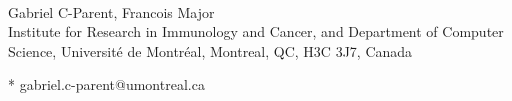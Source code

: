 \documentclass[10pt,letterpaper]{article}
\date{}
\begin{document}
\vspace*{0.35in}

\begin{flushleft}
{\Large
\textbf{}
}
\newline
\\
Gabriel C-Parent, %
Francois Major%
\\
\bigskip
Institute for Research in Immunology and Cancer, and Department of Computer Science, Université de Montréal, Montreal, QC, H3C 3J7, Canada
\\
\bigskip

% 
%
%
%
%
%
%
* gabriel.c-parent@umontreal.ca

\end{flushleft}


\end{document}
